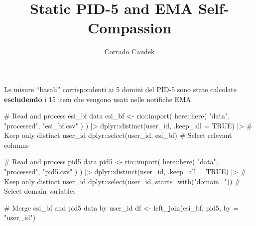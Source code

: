 \documentclass[
  11pt,
  a4paper,
  onecolumn]{article}
\title{Static PID-5 and EMA Self-Compassion}
\author{Corrado Caudek}
\date{}
\newenvironment{Shaded}{}{}
\newcommand{\AttributeTok}[1]{\textcolor[rgb]{0.84,0.23,0.29}{#1}}
\newcommand{\CommentTok}[1]{\textcolor[rgb]{0.42,0.45,0.49}{#1}}
\newcommand{\ConstantTok}[1]{\textcolor[rgb]{0.00,0.36,0.77}{#1}}
\newcommand{\FunctionTok}[1]{\textcolor[rgb]{0.44,0.26,0.76}{#1}}
\newcommand{\NormalTok}[1]{\textcolor[rgb]{0.14,0.16,0.18}{#1}}
\newcommand{\OtherTok}[1]{\textcolor[rgb]{0.44,0.26,0.76}{#1}}
\newcommand{\SpecialCharTok}[1]{\textcolor[rgb]{0.00,0.36,0.77}{#1}}
\newcommand{\StringTok}[1]{\textcolor[rgb]{0.01,0.18,0.38}{#1}}
\begin{document}
\maketitle


Le misure ``basali'' corrispondenti ai 5 domini del PID-5 sono state
calcolate \textbf{escludendo} i 15 item che vengono usati nelle
notifiche EMA.

\begin{Shaded}
\begin{Highlighting}[]
\CommentTok{\# Read and process \textquotesingle{}esi\_bf\textquotesingle{} data}
\NormalTok{esi\_bf }\OtherTok{\textless{}{-}}\NormalTok{ rio}\SpecialCharTok{::}\FunctionTok{import}\NormalTok{(}
\NormalTok{  here}\SpecialCharTok{::}\FunctionTok{here}\NormalTok{(}
    \StringTok{"data"}\NormalTok{,}
    \StringTok{"processed"}\NormalTok{,}
    \StringTok{"esi\_bf.csv"}
\NormalTok{  )}
\NormalTok{) }\SpecialCharTok{|\textgreater{}}
\NormalTok{  dplyr}\SpecialCharTok{::}\FunctionTok{distinct}\NormalTok{(user\_id, }\AttributeTok{.keep\_all =} \ConstantTok{TRUE}\NormalTok{) }\SpecialCharTok{|\textgreater{}} \CommentTok{\# Keep only distinct user\_id}
\NormalTok{  dplyr}\SpecialCharTok{::}\FunctionTok{select}\NormalTok{(user\_id, esi\_bf) }\CommentTok{\# Select relevant columns}

\CommentTok{\# Read and process \textquotesingle{}pid5\textquotesingle{} data}
\NormalTok{pid5 }\OtherTok{\textless{}{-}}\NormalTok{ rio}\SpecialCharTok{::}\FunctionTok{import}\NormalTok{(}
\NormalTok{  here}\SpecialCharTok{::}\FunctionTok{here}\NormalTok{(}
    \StringTok{"data"}\NormalTok{,}
    \StringTok{"processed"}\NormalTok{,}
    \StringTok{"pid5.csv"}
\NormalTok{  )}
\NormalTok{) }\SpecialCharTok{|\textgreater{}}
\NormalTok{  dplyr}\SpecialCharTok{::}\FunctionTok{distinct}\NormalTok{(user\_id, }\AttributeTok{.keep\_all =} \ConstantTok{TRUE}\NormalTok{) }\SpecialCharTok{|\textgreater{}}  \CommentTok{\# Keep only distinct user\_id}
\NormalTok{  dplyr}\SpecialCharTok{::}\FunctionTok{select}\NormalTok{(user\_id, }\FunctionTok{starts\_with}\NormalTok{(}\StringTok{"domain\_"}\NormalTok{)) }\CommentTok{\# Select domain variables}

\CommentTok{\# Merge \textquotesingle{}esi\_bf\textquotesingle{} and \textquotesingle{}pid5\textquotesingle{} data by user\_id}
\NormalTok{df }\OtherTok{\textless{}{-}} \FunctionTok{left\_join}\NormalTok{(esi\_bf, pid5, }\AttributeTok{by =} \StringTok{"user\_id"}\NormalTok{)}
\end{Highlighting}
\end{Shaded}
\end{document}
